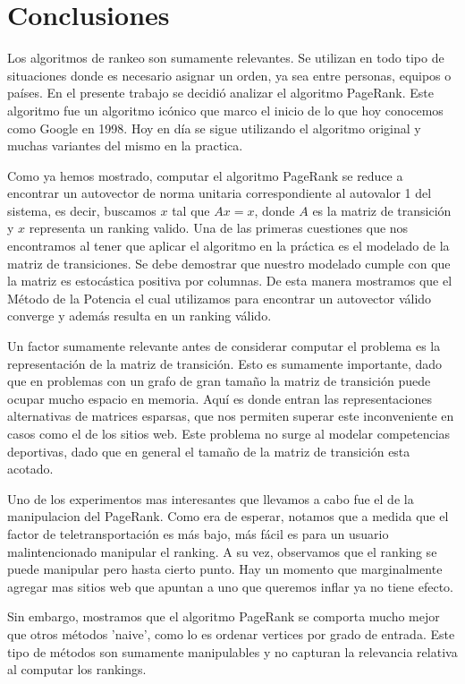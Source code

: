 \section{Conclusiones}

Los algoritmos de rankeo son sumamente relevantes. Se utilizan en todo tipo de situaciones donde es necesario asignar un orden, ya sea entre personas, equipos o países. En el presente trabajo se decidió analizar el algoritmo PageRank. Este algoritmo fue un algoritmo icónico que marco el inicio de lo que hoy conocemos como Google en 1998. Hoy en día se sigue utilizando el algoritmo original y muchas variantes del mismo en la practica.

Como ya hemos mostrado, computar el algoritmo PageRank se reduce a encontrar un autovector de norma unitaria correspondiente al autovalor 1 del sistema, es decir, buscamos $x$ tal que $Ax = x$, donde $A$ es la matriz de transición y $x$ representa un ranking valido. Una de las primeras cuestiones que nos encontramos al tener que aplicar el algoritmo en la práctica es el modelado de la matriz de transiciones. Se debe demostrar que nuestro modelado cumple con que la matriz es estocástica positiva por columnas. De esta manera mostramos que el Método de la Potencia el cual utilizamos para encontrar un autovector válido converge y además resulta en un ranking válido.

Un factor sumamente relevante antes de considerar computar el problema es la representación de la matriz de transición. Esto es sumamente importante, dado que en problemas con un grafo de gran tamaño la matriz de transición puede ocupar mucho espacio en memoria. Aquí es donde entran las representaciones alternativas de matrices esparsas, que nos permiten superar este inconveniente en casos como el de los sitios web. Este problema no surge al modelar competencias deportivas, dado que en general el tamaño de la matriz de transición esta acotado. 

Uno de los experimentos mas interesantes que llevamos a cabo fue el de la manipulacion del PageRank. Como era de esperar, notamos que a medida que el factor de teletransportación es más bajo, más fácil es para un usuario malintencionado manipular el ranking. A su vez, observamos que el ranking se puede manipular pero hasta cierto punto. Hay un momento que marginalmente agregar mas sitios web que apuntan a uno que queremos inflar ya no tiene efecto.

Sin embargo, mostramos que el algoritmo PageRank se comporta mucho mejor que otros métodos 'naive', como lo es ordenar vertices por grado de entrada. Este tipo de métodos son sumamente manipulables y no capturan la relevancia relativa al computar los rankings.

